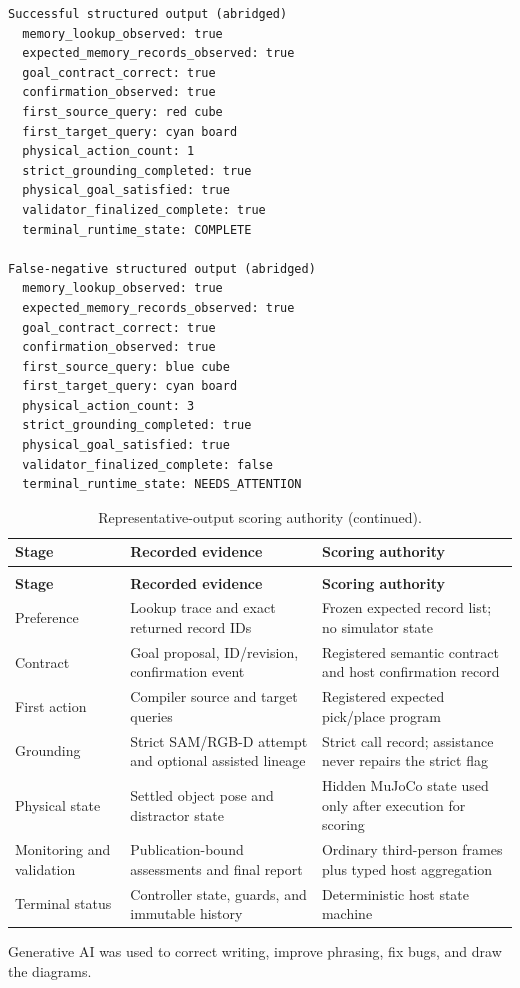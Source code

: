\documentclass{article}
\begin{document}
\begingroup
\footnotesize
\begin{verbatim}
Successful structured output (abridged)
  memory_lookup_observed: true
  expected_memory_records_observed: true
  goal_contract_correct: true
  confirmation_observed: true
  first_source_query: red cube
  first_target_query: cyan board
  physical_action_count: 1
  strict_grounding_completed: true
  physical_goal_satisfied: true
  validator_finalized_complete: true
  terminal_runtime_state: COMPLETE

False-negative structured output (abridged)
  memory_lookup_observed: true
  expected_memory_records_observed: true
  goal_contract_correct: true
  confirmation_observed: true
  first_source_query: blue cube
  first_target_query: cyan board
  physical_action_count: 3
  strict_grounding_completed: true
  physical_goal_satisfied: true
  validator_finalized_complete: false
  terminal_runtime_state: NEEDS_ATTENTION
\end{verbatim}
\endgroup

{\small
\renewcommand{\arraystretch}{1.12}
\begin{longtable}{@{}P{3.0cm}P{5.7cm}P{5.9cm}@{}}
    \caption{Authority used to score the representative output fields.}
    \label{tab:app-output-authority} \\
    \toprule
    \textbf{Stage} & \textbf{Recorded evidence} & \textbf{Scoring authority} \\
    \midrule
    \endfirsthead
    \caption[]{Representative-output scoring authority (continued).} \\
    \toprule
    \textbf{Stage} & \textbf{Recorded evidence} & \textbf{Scoring authority} \\
    \midrule
    \endhead
    \bottomrule
    \endlastfoot
    Preference & Lookup trace and exact returned record IDs & Frozen expected
    record list; no simulator state \\
    Contract & Goal proposal, ID/revision, confirmation event & Registered
    semantic contract and host confirmation record \\
    First action & Compiler source and target queries & Registered expected
    pick/place program \\
    Grounding & Strict SAM/RGB-D attempt and optional assisted lineage & Strict
    call record; assistance never repairs the strict flag \\
    Physical state & Settled object pose and distractor state & Hidden MuJoCo
    state used only after execution for scoring \\
    Monitoring and validation & Publication-bound assessments and final report &
    Ordinary third-person frames plus typed host aggregation \\
    Terminal status & Controller state, guards, and immutable history &
    Deterministic host state machine \\
\end{longtable}
}



Generative AI was used to correct writing, improve phrasing, fix bugs, and draw the diagrams.
\printbibliography
\end{document}

